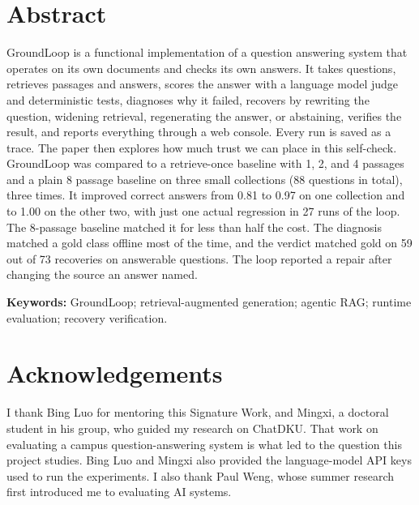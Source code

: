 \documentclass[12pt, a4paper, oneside]{report}
\begin{document}
\doublespacing %


\chapter*{Abstract}


GroundLoop is a functional implementation of a question answering system
that operates on its own documents and checks its own answers. It takes
questions, retrieves passages and answers, scores the answer with a
language model judge and deterministic tests, diagnoses why it failed,
recovers by rewriting the question, widening retrieval, regenerating the
answer, or abstaining, verifies the result, and reports everything through
a web console. Every run is saved as a trace. The paper then explores how much
trust we can place in this self-check. GroundLoop was compared to a
retrieve-once baseline with 1, 2, and 4 passages and a plain 8 passage
baseline on three small collections (88 questions in total), three times. It
improved correct answers from 0.81 to 0.97 on one collection and to 1.00 on
the other two, with just one actual regression in 27 runs of the loop. The
8-passage baseline matched it for less than half the cost. The diagnosis
matched a gold class offline most of the time, and the verdict matched gold
on 59 out of 73 recoveries on answerable questions. The loop reported a
repair after changing the source an answer named.

\textbf{Keywords:} GroundLoop; retrieval-augmented generation; agentic
RAG; runtime evaluation; recovery verification.

\vspace{4\bigskipamount}



\chapter*{Acknowledgements}
\label{acknowledgements}

I thank Bing Luo for mentoring this Signature Work, and Mingxi, a doctoral
student in his group, who guided my research on ChatDKU. That work on
evaluating a campus question-answering system is what led to the question
this project studies. Bing Luo and Mingxi also provided the language-model
API keys used to run the experiments. I also thank Paul Weng, whose summer research
first introduced me to evaluating AI systems.
\end{document}
